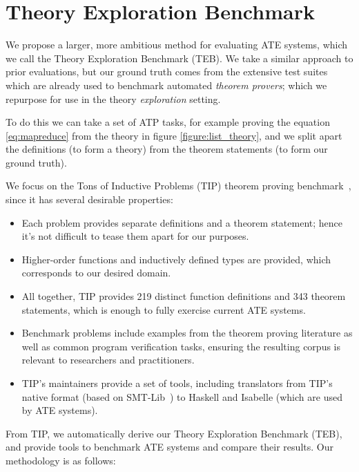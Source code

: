 \section{Theory Exploration Benchmark}
\label{sec:proposal}

We propose a larger, more ambitious method for evaluating ATE systems, which we
call the Theory Exploration Benchmark (TEB). We take a similar approach to prior
evaluations, but our ground truth comes from the extensive test suites which are
already used to benchmark automated \emph{theorem provers}; which we repurpose
for use in the theory \emph{exploration} setting.

To do this we can take a set of ATP tasks, for example proving the equation
\ref{eq:mapreduce} from the theory in figure \ref{figure:list_theory}, and we
split apart the definitions (to form a theory) from the theorem statements (to
form our ground truth).

We focus on the Tons of Inductive Problems (TIP) theorem proving
benchmark~\cite{claessen2015tip}, since it has several desirable properties:

\begin{itemize}
\item Each problem provides separate definitions and a theorem statement; hence
  it's not difficult to tease them apart for our purposes.
\item Higher-order functions and inductively defined types are provided, which
  corresponds to our desired domain.
\item All together, TIP provides 219 distinct function definitions and 343
  theorem statements, which is enough to fully exercise current ATE systems.
\item Benchmark problems include examples from the theorem proving literature
  as well as common program verification tasks, ensuring the resulting corpus is
  relevant to researchers and practitioners.
\item TIP's maintainers provide a set of tools, including translators from TIP's
  native format (based on SMT-Lib~\cite{BarFT-SMTLIB}) to Haskell and Isabelle
  (which are used by ATE systems).
\end{itemize}

From TIP, we automatically derive our Theory Exploration Benchmark (TEB), and
provide tools to benchmark ATE systems and compare their results. Our
methodology is as follows:

